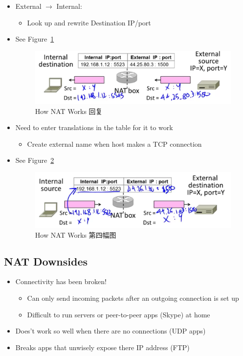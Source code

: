 \documentclass[12pt]{ctexart}   %
\begin{document}
\begin{itemize}
		  \item External $\rightarrow$ Internal:
		 \begin{itemize}
		 	\item Look up and rewrite Destination IP/port
		 \end{itemize}
		 \item See Figure~\ref{fig:4-10-6}
		
		\begin{figure}[h!] %
		\centering
		 \includegraphics[scale=0.7]{images/4-10-6}
		\caption{ How NAT Works 回复 }
		 \label{fig:4-10-6}
		 \end{figure}
		 
		 \item Need to enter translations in the table for it to work
		 \begin{itemize}
		 	\item Create external name when host makes a TCP connection
		 \end{itemize}
		 \item See Figure~\ref{fig:4-10-7}
		
		\begin{figure}[h!] %
		\centering
		 \includegraphics[scale=0.7]{images/4-10-7}
		\caption{ How NAT Works 第四幅图}
		 \label{fig:4-10-7}
		 \end{figure}
	\end{itemize}
	
	\subsection{NAT Downsides}
	\begin{itemize}
		\item Connectivity has been broken!
		\begin{itemize}
			\item Can only send incoming packets after an outgoing connection is set up
			\item Difficult to run servers or peer-to-peer apps (Skype) at home
		\end{itemize}
		
		\item Does't work so well when there are no connections (UDP apps)
		\item Breaks apps that unwisely expose there IP address (FTP)
	\end{itemize}
	
\end{document}
